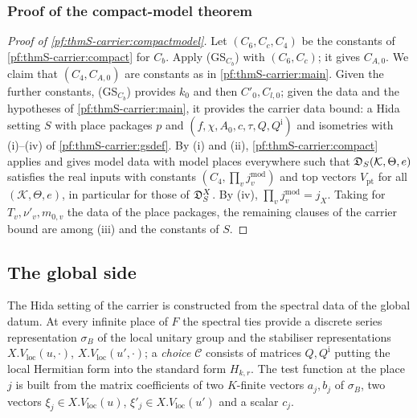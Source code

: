 \subsubsection{Proof of the compact-model theorem}\label{sec:pf:thmS-carrier:compactproof}
\begin{proof}[Proof of \cref{pf:thmS-carrier:compactmodel}]
Let $(C_6,C_c,C_4)$ be the constants of \cref{pf:thmS-carrier:compact} for $C_b$. Apply (GS$_{C_b}$) with $(C_6,C_c)$; it gives
$C_{A,0}$. We claim that $(C_4,C_{A,0})$ are constants as in \cref{pf:thmS-carrier:main}. Given the further constants,
(GS$_{C_b}$) provides $k_0$ and then $C'_0,C_{l,0}$; given the data and the hypotheses of \cref{pf:thmS-carrier:main}, it
provides the carrier data bound: a Hida setting $S$ with place packages $p$ and $(f,\chi,A_0,c,\tau,Q,Q^{\mathrm i})$ and
isometries with (i)--(iv) of \cref{pf:thmS-carrier:gsdef}. By (i) and (ii), \cref{pf:thmS-carrier:compact} applies and gives
model data with model places everywhere such that $\mathfrak{D}_S(\mathcal K,\Theta,e)$ satisfies the real inputs with
constants $(C_4,\prod_vj^{\mathrm{mod}}_v)$ and top vectors $V_{\mathrm{pt}}$ for all $(\mathcal K,\Theta,e)$, in particular
for those of $\mathfrak{D}^X_S$. By (iv), $\prod_vj_v^{\mathrm{mod}}=j_X$. Taking for $T_v,\nu'_v,m_{0,v}$ the
data of the place packages, the remaining clauses of the carrier bound are among (iii) and the constants of $S$.
\end{proof}

\subsection{The global side}\label{sec:pf:thmS-carrier:X}

The Hida setting of the carrier is constructed from the spectral data of the global datum. At every infinite place of $F$ the
spectral ties provide a discrete series representation $\sigma_B$ of the local unitary group and the stabiliser
representations $X.V_{\mathrm{loc}}(u,\cdot)$, $X.V_{\mathrm{loc}}(u',\cdot)$; a \emph{choice} $\mathcal C$ consists of
matrices $Q,Q^{\mathrm i}$ putting the local Hermitian form into the standard form $H_{k,r}$. The test function at the place
$j$ is built from the matrix coefficients of two $K$-finite vectors $a_j,b_j$ of $\sigma_B$, two vectors
$\xi_j\in X.V_{\mathrm{loc}}(u)$, $\xi'_j\in X.V_{\mathrm{loc}}(u')$ and a scalar $c_j$.

